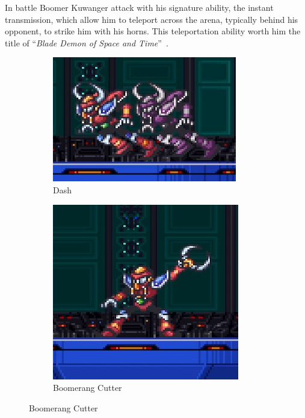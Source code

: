 In battle Boomer Kuwanger attack with his signature ability, the instant transmission, which allow him to teleport across the arena, typically behind his opponent, to strike him with his horns. This teleportation ability worth him the title of  ``\textit{Blade Demon of Space and Time}''~\cite{book:MMX_Complete_art}. 
\begin{figure}[htp]
	\centering
	\begin{subfigure}{0.41\linewidth}
		\centering
		\includegraphics[width=\linewidth]{figures/X1/Boomer_kuwanger/Boomer_dash.jpg}
		\caption{Dash}
	\end{subfigure}
	\begin{subfigure}{0.3\linewidth}
		\centering
		\includegraphics[width=\linewidth]{figures/X1/Boomer_kuwanger/Boomer_throw.jpg}
		\caption{Boomerang Cutter}
	\end{subfigure}

\end{figure}
